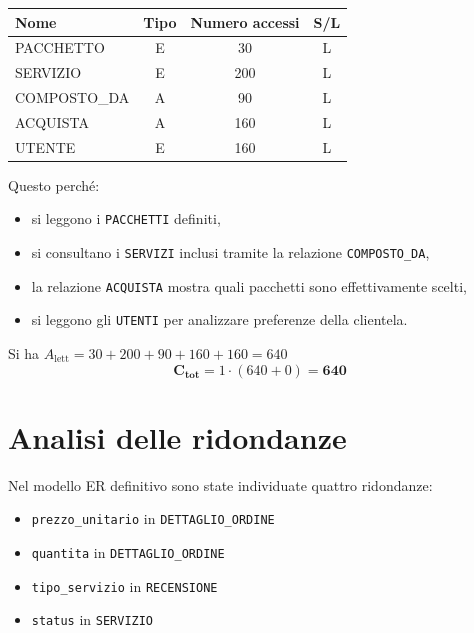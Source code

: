 \documentclass[a4paper,12pt]{report}
\begin{document}
\begin{enumerate}
	      \begin{table}[H]
		      \centering
		      \small
		      \renewcommand{\arraystretch}{1.15}
		      \begin{tabularx}{0.8\textwidth}{|X|c|c|c|}
			      \hline
			      \rowcolor{gray!20}
			      \textbf{Nome} & \textbf{Tipo} & \textbf{Numero accessi} & \textbf{S/L} \\
			      \hline
			      PACCHETTO     & E             & 30                      & L            \\
			      SERVIZIO      & E             & 200                     & L            \\
			      COMPOSTO\_DA  & A             & 90                      & L            \\
			      ACQUISTA      & A             & 160                     & L            \\
			      UTENTE        & E             & 160                     & L            \\
			      \hline
		      \end{tabularx}
	      \end{table}

	      Questo perché:
	      \begin{itemize}
		      \item si leggono i \texttt{PACCHETTI} definiti,
		      \item si consultano i \texttt{SERVIZI} inclusi tramite la relazione \texttt{COMPOSTO\_DA},
		      \item la relazione \texttt{ACQUISTA} mostra quali pacchetti sono effettivamente scelti,
		      \item si leggono gli \texttt{UTENTI} per analizzare preferenze della clientela.
	      \end{itemize}

	      Si ha $A_{\text{lett}} = 30 + 200 + 90 + 160 + 160 = 640$
	      $$\mathbf{C_{tot}} = 1 \cdot (640 + 0) = \mathbf{640}$$
\end{enumerate}

\section{Analisi delle ridondanze}

Nel modello ER definitivo sono state individuate quattro ridondanze:
\begin{itemize}
    \item \texttt{prezzo\_unitario} in \texttt{DETTAGLIO\_ORDINE}
    \item \texttt{quantita} in \texttt{DETTAGLIO\_ORDINE}
    \item \texttt{tipo\_servizio} in \texttt{RECENSIONE}
    \item \texttt{status} in \texttt{SERVIZIO}
\end{itemize}  
\end{document}
